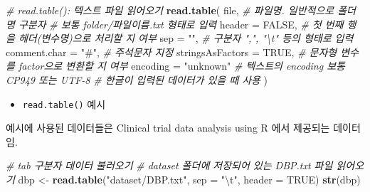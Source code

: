 \documentclass[
  11pt,
]{krantz}
\makeatletter
\newenvironment{Shaded}{\begin{snugshade}}{\end{snugshade}}
\newcommand{\CharTok}[1]{\textcolor[rgb]{0.5,0.5,0.5}{#1}}
\newcommand{\CommentTok}[1]{\textcolor[rgb]{0.37,0.37,0.37}{\textit{#1}}}
\newcommand{\DataTypeTok}[1]{\textcolor[rgb]{0.27,0.27,0.27}{#1}}
\newcommand{\KeywordTok}[1]{\textcolor[rgb]{0.27,0.27,0.27}{\textbf{#1}}}
\newcommand{\NormalTok}[1]{#1}
\newcommand{\OtherTok}[1]{\textcolor[rgb]{0.37,0.37,0.37}{#1}}
\newcommand{\StringTok}[1]{\textcolor[rgb]{0.5,0.5,0.5}{#1}}
\providecommand{\tightlist}{%
  \setlength{\itemsep}{0pt}\setlength{\parskip}{0pt}}
\newenvironment{kframe}{%
\medskip{}
\setlength{\fboxsep}{.8em}
 \def\at@end@of@kframe{}%
 \ifinner\ifhmode%
  \def\at@end@of@kframe{\end{minipage}}%
  \begin{minipage}{\columnwidth}%
 \fi\fi%
 \def\FrameCommand##1{\hskip\@totalleftmargin \hskip-\fboxsep
 \colorbox{shadecolor}{##1}\hskip-\fboxsep
     \hskip-\linewidth \hskip-\@totalleftmargin \hskip\columnwidth}%
 \MakeFramed {\advance\hsize-\width
   \@totalleftmargin\z@ \linewidth\hsize
   \@setminipage}}%
 {\par\unskip\endMakeFramed%
 \at@end@of@kframe}
\newenvironment{rmdblock}[1]
  {
  \begin{itemize}
  \renewcommand{\labelitemi}{
    \raisebox{-.7\height}[0pt][0pt]{
      {\setkeys{Gin}{width=3em,keepaspectratio}\texttt{[image: images/\#1]}}
    }
  }
  \setlength{\fboxsep}{1em}
  \begin{kframe}
  \item
  }
  {
  \end{kframe}
  \end{itemize}
  }
\newenvironment{rmdnote}
  {\begin{rmdblock}{note}}
  {\end{rmdblock}}
\makeatother
\begin{document}
\footnotesize

\begin{Shaded}
\begin{Highlighting}[]
\CommentTok{# read.table(): 텍스트 파일 읽어오기}
\KeywordTok{read.table}\NormalTok{(}
\NormalTok{  file, }\CommentTok{# 파일명. 일반적으로 폴더명 구분자 }
        \CommentTok{# 보통 folder/파일이름.txt 형태로 입력}
  \DataTypeTok{header =} \OtherTok{FALSE}\NormalTok{, }\CommentTok{# 첫 번째 행을 헤더(변수명)으로 처리할 지 여부}
  \DataTypeTok{sep =} \StringTok{""}\NormalTok{, }\CommentTok{# 구분자 ",", "\textbackslash{}t" 등의 형태로 입력}
  \DataTypeTok{comment.char =} \StringTok{"#"}\NormalTok{, }\CommentTok{# 주석문자 지정}
  \DataTypeTok{stringsAsFactors =} \OtherTok{TRUE}\NormalTok{, }\CommentTok{# 문자형 변수를 factor으로 변환할 지 여부}
  \DataTypeTok{encoding =} \StringTok{"unknown"} \CommentTok{# 텍스트의 encoding 보통 CP949 또는 UTF-8}
                       \CommentTok{# 한글이 입력된 데이터가 있을 때 사용}
\NormalTok{)}
\end{Highlighting}
\end{Shaded}

\normalsize

\begin{itemize}
\tightlist
\item
  \texttt{read.table()} 예시
\end{itemize}

\footnotesize

\begin{rmdnote}
\begin{rmdnote}

예시에 사용된 데이터들은 Clinical trial data analysis using R \citep{chen-2010}에서 제공되는 데이터임.

\end{rmdnote}
\end{rmdnote}

\normalsize

\footnotesize

\begin{Shaded}
\begin{Highlighting}[]
\CommentTok{# tab 구분자 데이터 불러오기}
\CommentTok{# dataset 폴더에 저장되어 있는 DBP.txt 파일 읽어오기}
\NormalTok{dbp <-}\StringTok{ }\KeywordTok{read.table}\NormalTok{(}\StringTok{"dataset/DBP.txt"}\NormalTok{, }\DataTypeTok{sep =} \StringTok{"}\CharTok{\textbackslash{}t}\StringTok{"}\NormalTok{, }\DataTypeTok{header =} \OtherTok{TRUE}\NormalTok{)}
\KeywordTok{str}\NormalTok{(dbp)}
\end{Highlighting}
\end{Shaded}
\end{document}
